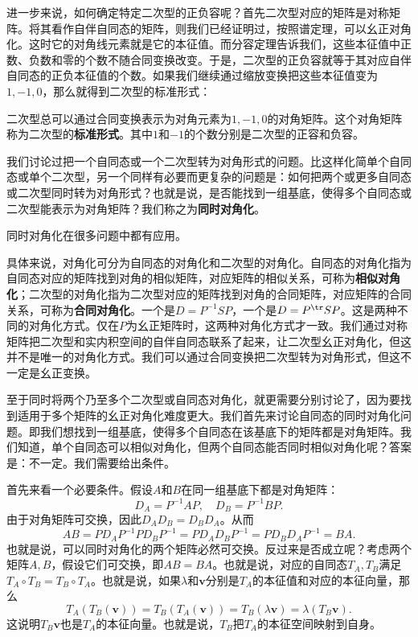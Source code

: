 \documentclass[12pt,UTF8]{ctexbook}
\begin{document}
进一步来说，如何确定特定二次型的正负容呢？首先二次型对应的矩阵是对称矩阵。将其看作自伴自同态的矩阵，则我们已经证明过，按照谱定理，可以幺正对角化。这时它的对角线元素就是它的本征值。而分容定理告诉我们，这些本征值中正数、负数和零的个数不随合同变换改变。于是，二次型的正负容就等于其对应自伴自同态的正负本征值的个数。如果我们继续通过缩放变换把这些本征值变为$1,-1,0$，那么就得到二次型的标准形式：
\begin{tm}
    二次型总可以通过合同变换表示为对角元素为$1,-1,0$的对角矩阵。这个对角矩阵称为二次型的\textbf{标准形式}。其中$1$和$-1$的个数分别是二次型的正容和负容。
\end{tm}

我们讨论过把一个自同态或一个二次型转为对角形式的问题。比这样化简单个自同态或单个二次型，另一个同样有必要而更复杂的问题是：如何把两个或更多自同态或二次型同时转为对角形式？也就是说，是否能找到一组基底，使得多个自同态或二次型能表示为对角矩阵？我们称之为\textbf{同时对角化}。

同时对角化在很多问题中都有应用。

具体来说，对角化可分为自同态的对角化和二次型的对角化。自同态的对角化指为自同态对应的矩阵找到对角的相似矩阵，对应矩阵的相似关系，可称为\textbf{相似对角化}；二次型的对角化指为二次型对应的矩阵找到对角的合同矩阵，对应矩阵的合同关系，可称为\textbf{合同对角化}。一个是$D = P^{-1}SP$，一个是$D = P^{\tr}SP$。这是两种不同的对角化方式。仅在$P$为幺正矩阵时，这两种对角化方式才一致。我们通过对称矩阵把二次型和实内积空间的自伴自同态联系了起来，让二次型幺正对角化，但这并不是唯一的对角化方式。我们可以通过合同变换把二次型转为对角形式，但这不一定是幺正变换。

至于同时将两个乃至多个二次型或自同态对角化，就更需要分别讨论了，因为要找到适用于多个矩阵的幺正对角化难度更大。我们首先来讨论自同态的同时对角化问题。即我们想找到一组基底，使得多个自同态在该基底下的矩阵都是对角矩阵。我们知道，单个自同态可以相似对角化，但两个自同态能否同时相似对角化呢？答案是：不一定。我们需要给出条件。

首先来看一个必要条件。假设$A$和$B$在同一组基底下都是对角矩阵：
$$ D_A = P^{-1}AP, \quad D_B = P^{-1}BP. $$
由于对角矩阵可交换，因此$D_AD_B = D_BD_A$。从而
$$ AB = P D_A P^{-1} P D_B P^{-1} = P D_A D_B P^{-1} = P D_B D_A P^{-1} = B A. $$
也就是说，可以同时对角化的两个矩阵必然可交换。反过来是否成立呢？考虑两个矩阵$A,B$，假设它们可交换，即$AB = BA$。也就是说，对应的自同态$T_A, T_B$满足$T_A\circ T_B = T_B\circ T_A$。也就是说，如果$\lambda$和$\mathbf{v}$分别是$T_A$的本征值和对应的本征向量，那么
$$ T_A(T_B(\mathbf{v})) = T_B(T_A(\mathbf{v})) = T_B(\lambda \mathbf{v}) = \lambda (T_B\mathbf{v}). $$
这说明$T_B\mathbf{v}$也是$T_A$的本征向量。也就是说，$T_B$把$T_A$的本征空间映射到自身。
\end{document}

